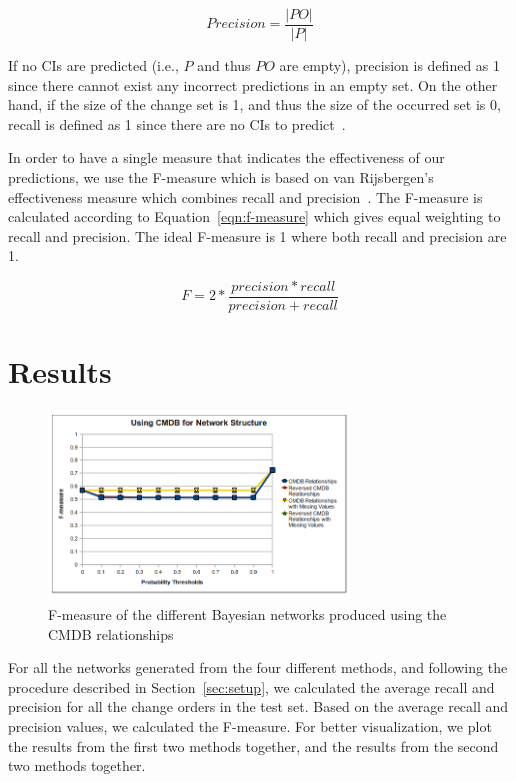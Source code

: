 \documentclass{article}
\begin{document}
\begin{equation}
\label{eqn:precision}
Precision = \frac{|PO|}{|P|}
\end{equation}

If no CIs are predicted (i.e., $P$ and thus $PO$ are empty), precision is defined as 1 since there cannot exist any incorrect predictions in an empty set. On
the other hand, if the size of the change set is 1, and thus the size of the occurred set is 0, recall is defined as 1 since there are no CIs to
predict~\cite{hassan2004predicting}.  

In order to have a single measure that indicates the effectiveness of our predictions, we use the F-measure which is based on van Rijsbergen's effectiveness
measure which combines recall and precision~\cite{van79}. The F-measure is calculated according to Equation~\ref{eqn:f-measure} which gives equal weighting to
recall and precision. The ideal F-measure is 1 where both recall and precision are 1.

\begin{equation}
F = 2 * \frac{precision * recall}{precision +recall}
\label{eqn:f-measure}
\end{equation}


\section{Results}
\label{sec:results}

\begin{figure}[!t]
\centering
\includegraphics[width=8cm]{graphics/cmdbresults.png}
\caption{F-measure of the different Bayesian networks produced using the CMDB relationships}
\label{fig:cmdbresults}
\end{figure}

For all the networks generated from the four different methods, and following the procedure described in Section~\ref{sec:setup}, we calculated the average
recall and precision for all the change orders in the test set. Based on the average recall and precision values, we calculated the F-measure. For better
visualization, we plot the results from the first two methods together, and the results from the second two methods together. 
\end{document}
